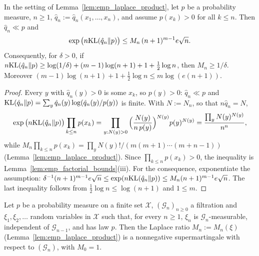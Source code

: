 \begin{lemma}\label{lem:emp_laplace_lower_bound}
\leanok
{}
In the setting of Lemma~\ref{lem:emp_laplace_product}, let $p$ be a probability measure, $n \ge 1$,
$\hat q_n := \hat q_n(x_1, \dots, x_n)$, and assume $p(x_k) > 0$ for all $k \le n$. Then
$\hat q_n \ll p$ and
\[
  \exp\big(n \mathrm{KL}(\hat q_n \| p)\big) \le M_n\, (n + 1)^{m - 1} e \sqrt n .
\]
Consequently, for $\delta > 0$, if
$n \mathrm{KL}(\hat q_n \| p) \ge \log(1/\delta) + (m - 1)\log(n + 1) + 1 + \frac12 \log n$, then
$M_n \ge 1/\delta$. Moreover
$(m - 1)\log(n + 1) + 1 + \frac12 \log n \le m \log(e(n + 1))$.
\end{lemma}

\begin{proof}
\leanok
{}
Every $y$ with $\hat q_n(y) > 0$ is some $x_k$, so $p(y) > 0$: $\hat q_n \ll p$ and
$\mathrm{KL}(\hat q_n \| p) = \sum_y \hat q_n(y) \log(\hat q_n(y)/p(y))$ is finite. With $N := N_n$, so
that $n \hat q_n = N$,
\[
  \exp\big(n \mathrm{KL}(\hat q_n \| p)\big) \prod_{k \le n} p(x_k)
  = \prod_{y : N(y) > 0} \Big(\frac{N(y)}{n\, p(y)}\Big)^{N(y)} p(y)^{N(y)}
  = \frac{\prod_y N(y)^{N(y)}}{n^n} ,
\]
while $M_n \prod_{k \le n} p(x_k) = \prod_y N(y)!/(m (m + 1) \cdots (m + n - 1))$
(Lemma~\ref{lem:emp_laplace_product}). Since $\prod_{k \le n} p(x_k) > 0$, the inequality is
Lemma~\ref{lem:emp_factorial_bounds}(iii). For the consequence, exponentiate the assumption:
$\delta^{-1} (n + 1)^{m - 1} e \sqrt n \le \exp(n \mathrm{KL}(\hat q_n \| p)) \le M_n (n + 1)^{m - 1} e \sqrt n$.
The last inequality follows from $\frac12 \log n \le \log(n + 1)$ and $1 \le m$.
\end{proof}

\begin{lemma}\label{lem:emp_laplace_supermartingale}
\leanok
{}
Let $p$ be a probability measure on a finite set $\mathcal X$, $(\mathcal G_n)_{n \ge 0}$ a
filtration and $\xi_1, \xi_2, \dots$ random variables in $\mathcal X$ such that, for every
$n \ge 1$, $\xi_n$ is $\mathcal G_n$-measurable, independent of $\mathcal G_{n-1}$, and has law
$p$. Then the Laplace ratio $M_n := M_n(\xi)$ (Lemma~\ref{lem:emp_laplace_product}) is a
nonnegative supermartingale with respect to $(\mathcal G_n)$, with $M_0 = 1$.
\end{lemma}


